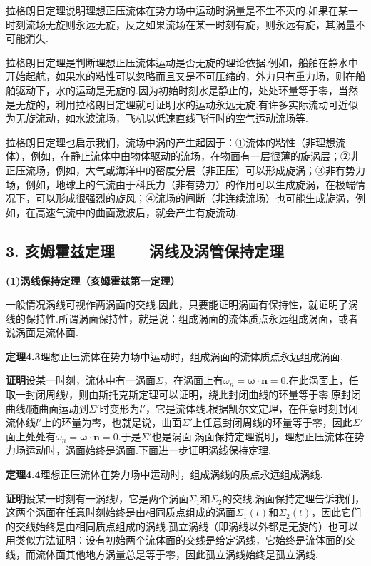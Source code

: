 拉格朗日定理说明理想正压流体在势力场中运动时涡量是不生不灭的.如果在某一时刻流场无旋则永远无旋，反之如果流场在某一时刻有旋，则永远有旋，其涡量不可能消失.

拉格朗日定理是判断理想正压流体运动是否无旋的理论依据.例如，船舶在静水中开始起航，如果水的粘性可以忽略而且又是不可压缩的，外力只有重力场，则在船舶驱动下，水的运动是无旋的.因为初始时刻水是静止的，处处环量等于零，当然是无旋的，利用拉格朗日定理就可证明水的运动永远无旋.有许多实际流动可近似为无旋流动，如水波流场，飞机以低速直线飞行时的空气运动流场等.

拉格朗日定理也启示我们，流场中涡的产生起因于：①流体的粘性（非理想流体），例如，在静止流体中由物体驱动的流场，在物面有一层很薄的旋涡层；②非正压流场，例如，大气或海洋中的密度分层（非正压）可以形成旋涡；③非有势力场，例如，地球上的气流由于科氏力（非有势力）的作用可以生成旋涡，在极端情况下，可以形成很强烈的旋风；④流场的间断（非连续流场）也可能生成旋涡，例如，在高速气流中的曲面激波后，就会产生有旋流动.

\subsection*{3. 亥姆霍兹定理——涡线及涡管保持定理}

\textbf{(1)涡线保持定理（亥姆霍兹第一定理）}

一般情况涡线可视作两涡面的交线.因此，只要能证明涡面有保持性，就证明了涡线的保持性.所谓涡面保持性，就是说：组成涡面的流体质点永远组成涡面，或者说涡面是流体面.

\noindent\textbf{定理4.3}\quad 理想正压流体在势力场中运动时，组成涡面的流体质点永远组成涡面.

\textbf{证明}\quad 设某一时刻，流体中有一涡面$\Sigma$，在涡面上有$\omega_n=\boldsymbol{\omega}\cdot\boldsymbol{n}=0$.在此涡面上，任取一封闭周线$l$，则由斯托克斯定理可以证明，绕此封闭曲线的环量等于零.原封闭曲线$l$随曲面运动到$\Sigma'$时变形为$l'$，它是流体线.根据凯尔文定理，在任意时刻封闭流体线$l'$上的环量为零，也就是说，曲面$\Sigma'$上任意封闭周线的环量等于零，因此$\Sigma'$面上处处有$\omega_n=\boldsymbol{\omega}\cdot\boldsymbol{n}=0$.于是$\Sigma'$也是涡面.涡面保持定理说明，理想正压流体在势力场运动时，涡面始终是涡面.下面进一步证明涡线保持定理.

\noindent\textbf{定理4.4}\quad 理想正压流体在势力场中运动时，组成涡线的质点永远组成涡线.

\textbf{证明}\quad 设某一时刻有一涡线$l$，它是两个涡面$\Sigma_1$和$\Sigma_2$的交线.涡面保持定理告诉我们，这两个涡面在任意时刻始终是由相同质点组成的涡面$\Sigma_1(t)$和$\Sigma_2(t)$，因此它们的交线始终是由相同质点组成的涡线.孤立涡线（即涡线以外都是无旋的）也可以用类似方法证明：设有初始两个流体面的交线是给定涡线，它始终是流体面的交线，而流体面其他地方涡量总是等于零，因此孤立涡线始终是孤立涡线.

